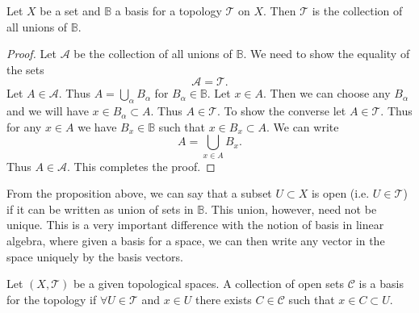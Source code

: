 \begin{proposition}
	\label{prop:charac_open_sets_in_terms_of_basis}
	Let $ X $ be a set and $ \mathbb{B} $ a basis for a topology $ \mathcal{T} $ on $ X $. Then $ \mathcal{T} $ is the collection of all unions of $ \mathbb{B} $.
\end{proposition}
\begin{proof}
	Let $ \mathcal{A} $ be the collection of all unions of $ \mathbb{B} $. We need to show the equality of the sets  
	\[ \mathcal{A} = \mathcal{T}. \]
	Let $ A \in \mathcal{A} $. Thus $ A = \bigcup_\alpha B_\alpha $ for $ B_\alpha \in \mathbb{B} $. Let $  x \in A $. Then we can choose any $ B_\alpha $ and we will have $ x \in B_\alpha \subset A $. Thus $ A \in \mathcal{T} $. To show the converse let $ A \in \mathcal{T} $. Thus for any $ x\in A $ we have $ B_x \in \mathbb{B} $ such that $ x \in B_x \subset A $. We can write
	\[ A = \bigcup_{x \in A} B_x. \]
	Thus $ A \in \mathcal{A} $. This completes the proof.
\end{proof}


\begin{carefull}
	From the proposition above, we can say that a subset $ U \subset X $ is open (i.e. $ U \in \mathcal{T} $) if it can be written as union of sets in $ \mathbb{B} $. This union, however, need not be unique. This is a very important difference with the notion of basis in linear algebra, where given a basis for a space, we can then write any vector in the space uniquely by the basis vectors.
\end{carefull}


\begin{proposition}
	Let $ (X,\mathcal{T}) $ be a given topological spaces. A collection of open sets $ \mathcal{C} $ is a basis for the topology if $ \forall U \in \mathcal{T} $ and $ x \in U $ there exists $ C \in \mathcal{C} $ such that $ x\in C \subset U $.
\end{proposition}

